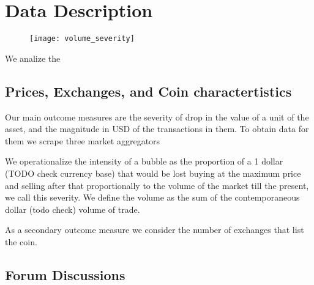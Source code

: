 \section{Data Description}

\begin{figure}[h]
\texttt{[image: volume\_severity]}
\end{figure}

We analize the 

\subsection{Prices, Exchanges, and Coin charactertistics}

Our main outcome measures are the severity of drop in the value of a unit of the asset, and the magnitude in USD of the transactions in them.
To obtain data for them we scrape three market aggregators 

We operationalize the intensity of a bubble as the proportion of a 1 dollar (TODO check currency base) that would be lost buying at the maximum price and selling after that proportionally to the volume of the market till the present, we call this severity.
We define the volume as the sum of the contemporaneous dollar (todo check) volume of trade.

As a secondary outcome measure we consider the number of exchanges that list the coin.


\subsection{Forum Discussions}

